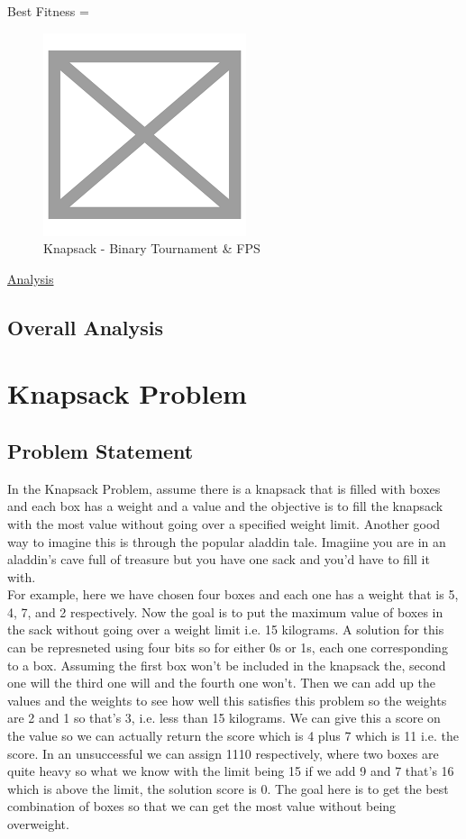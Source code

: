 \documentclass[11pt, letterpaper]{article}
\begin{document}
Best Fitness = 
\begin{figure}[H]
    \centering
    \includegraphics[scale = 0.6]{images/placeHolder.png}
    \caption {Knapsack - Binary Tournament \& FPS}
    \label {fig:tpsBF}
\end{figure}

\underline{Analysis}
\subsection {Overall Analysis}

\section{Knapsack Problem}
\subsection{Problem Statement}
In the Knapsack Problem, assume there is a knapsack that is  filled with boxes and each box has a 
weight and a value and the objective is to fill the knapsack with the most value without going over 
a specified weight limit. Another good way to imagine this is through the popular aladdin tale. 
Imagiine you are in an aladdin's cave full of treasure but you have one sack and you'd have to fill 
it with.\\
For example, here we have chosen four boxes and each one has a weight that is 5, 4, 7, and 2 
respectively. Now the goal is to put the maximum value of boxes in the sack without going over a 
weight limit i.e. 15 kilograms. A solution for this can be represneted using four bits so for either 0s 
or 1s, each one corresponding to a box. Assuming the first box
won't be included in the knapsack 
the, second one will the third one will and the fourth one won't. Then we can add up the values 
and the weights to see how well this satisfies this problem so the weights are 2 and 1 so that's 3, i.e. 
less than 15 kilograms. We can give this a score on the
value so we can actually return the score 
which is 4 plus 7 which is 11 i.e. the score. In an unsuccessful we can assign 1110 respectively, 
where two boxes are quite heavy so what we know with the limit being 15 if we add 9 and 7 that's 
16 which is above the limit, the solution score is 0. The goal here is to get the best combination of 
boxes so that we can get the most value without being overweight.
\end{document}
